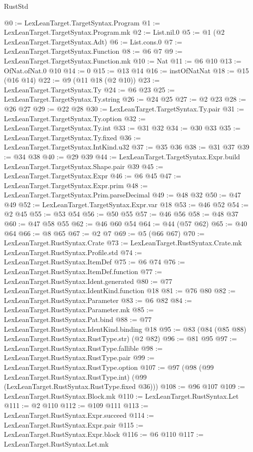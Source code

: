 \begin{lexlean}{RustStd}
\begin{coremodule}
@0 := LexLeanTarget.TargetSyntax.Program
@1 := LexLeanTarget.TargetSyntax.Program.mk
@2 := List.nil.{0}
@5 := @1 (@2 LexLeanTarget.TargetSyntax.Adt)
@6 := List.cons.{0}
@7 := LexLeanTarget.TargetSyntax.Function
@8 := @6 @7
@9 := LexLeanTarget.TargetSyntax.Function.mk
@10 := Nat
@11 := @6 @10
@13 := OfNat.ofNat.{0} @10
@14 := 0
@15 := @13 @14
@16 := instOfNatNat
@18 := @15 (@16 @14)
@22 := @9 (@11 @18 (@2 @10))
@23 := LexLeanTarget.TargetSyntax.Ty
@24 := @6 @23
@25 := LexLeanTarget.TargetSyntax.Ty.string
@26 := @24 @25
@27 := @2 @23
@28 := @26 @27
@29 := @22 @28
@30 := LexLeanTarget.TargetSyntax.Ty.pair
@31 := LexLeanTarget.TargetSyntax.Ty.option
@32 := LexLeanTarget.TargetSyntax.Ty.int
@33 := @31 @32
@34 := @30 @33
@35 := LexLeanTarget.TargetSyntax.Ty.fixed
@36 := LexLeanTarget.TargetSyntax.IntKind.u32
@37 := @35 @36
@38 := @31 @37
@39 := @34 @38
@40 := @29 @39
@44 := LexLeanTarget.TargetSyntax.Expr.build LexLeanTarget.TargetSyntax.Shape.pair @39
@45 := LexLeanTarget.TargetSyntax.Expr
@46 := @6 @45
@47 := LexLeanTarget.TargetSyntax.Expr.prim
@48 := LexLeanTarget.TargetSyntax.Prim.parseDecimal
@49 := @48 @32
@50 := @47 @49
@52 := LexLeanTarget.TargetSyntax.Expr.var @18
@53 := @46 @52
@54 := @2 @45
@55 := @53 @54
@56 := @50 @55
@57 := @46 @56
@58 := @48 @37
@60 := @47 @58 @55
@62 := @46 @60 @54
@64 := @44 (@57 @62)
@65 := @40 @64
@66 := @8 @65
@67 := @2 @7
@69 := @5 (@66 @67)
@70 := LexLeanTarget.RustSyntax.Crate
@73 := LexLeanTarget.RustSyntax.Crate.mk LexLeanTarget.RustSyntax.Profile.std
@74 := LexLeanTarget.RustSyntax.ItemDef
@75 := @6 @74
@76 := LexLeanTarget.RustSyntax.ItemDef.function
@77 := LexLeanTarget.RustSyntax.Ident.generated
@80 := @77 LexLeanTarget.RustSyntax.IdentKind.function @18
@81 := @76 @80
@82 := LexLeanTarget.RustSyntax.Parameter
@83 := @6 @82
@84 := LexLeanTarget.RustSyntax.Parameter.mk
@85 := LexLeanTarget.RustSyntax.Pat.bind
@88 := @77 LexLeanTarget.RustSyntax.IdentKind.binding @18
@95 := @83 (@84 (@85 @88) LexLeanTarget.RustSyntax.RustType.str) (@2 @82)
@96 := @81 @95
@97 := LexLeanTarget.RustSyntax.RustType.fallible
@98 := LexLeanTarget.RustSyntax.RustType.pair
@99 := LexLeanTarget.RustSyntax.RustType.option
@107 := @97
    (@98
      (@99 LexLeanTarget.RustSyntax.RustType.int)
      (@99 (LexLeanTarget.RustSyntax.RustType.fixed @36)))
@108 := @96 @107
@109 := LexLeanTarget.RustSyntax.Block.mk
@110 := LexLeanTarget.RustSyntax.Let
@111 := @2 @110
@112 := @109 @111
@113 := LexLeanTarget.RustSyntax.Expr.succeed
@114 := LexLeanTarget.RustSyntax.Expr.pair
@115 := LexLeanTarget.RustSyntax.Expr.block
@116 := @6 @110
@117 := LexLeanTarget.RustSyntax.Let.mk

\end{coremodule}
\end{lexlean}
